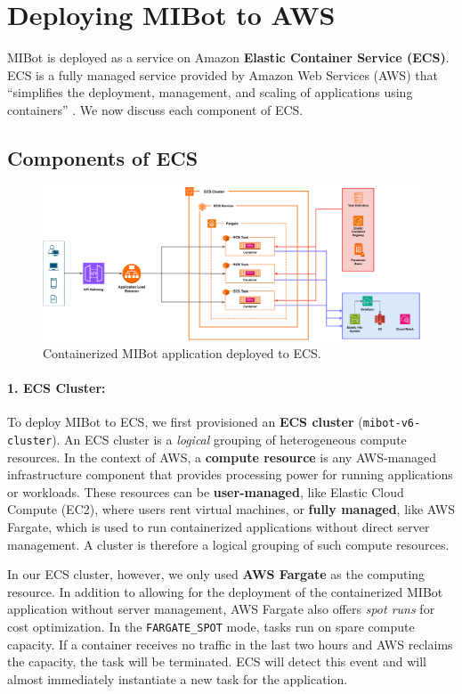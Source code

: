 \section{Deploying MIBot to AWS}
\label{sec:mibot-deployment}

MIBot is deployed as a service on Amazon \textbf{Elastic Container Service (ECS)}. ECS is a fully managed service provided by Amazon Web Services (AWS) that ``simplifies the deployment, management, and scaling of applications using containers'' \cite{aws-ecs-getting-started}. We now discuss each component of ECS.

\subsection{Components of ECS}
\begin{figure}[ht]
  \centering
  \includegraphics[width=0.99\linewidth]{fig/deployment.drawio.pdf} 
  \caption{Containerized MIBot application deployed to ECS.}
  \label{fig:ecs-components}
\end{figure}

\paragraph{1. ECS Cluster:}To deploy MIBot to ECS, we first provisioned an \textbf{ECS cluster} (\texttt{mibot-v6-cluster}). An ECS cluster is a \textit{logical} grouping of heterogeneous compute resources. In the context of AWS, a \textbf{compute resource} is any AWS-managed infrastructure component that provides processing power for running applications or workloads. These resources can be \textbf{user-managed}, like Elastic Cloud Compute (EC2), where users rent virtual machines, or \textbf{fully managed}, like AWS Fargate, which is used to run containerized applications without direct server management. A cluster is therefore a logical grouping of such compute resources.

In our ECS cluster, however, we only used \textbf{AWS Fargate} as the computing resource. In addition to allowing for the deployment of the containerized MIBot application without server management, AWS Fargate also offers \emph{spot runs} for cost optimization. In the \texttt{FARGATE\_SPOT} mode, tasks run on spare compute capacity. If a container receives no traffic in the last two hours and AWS reclaims the capacity, the task will be terminated. ECS will detect this event and will almost immediately instantiate a new task for the application.

